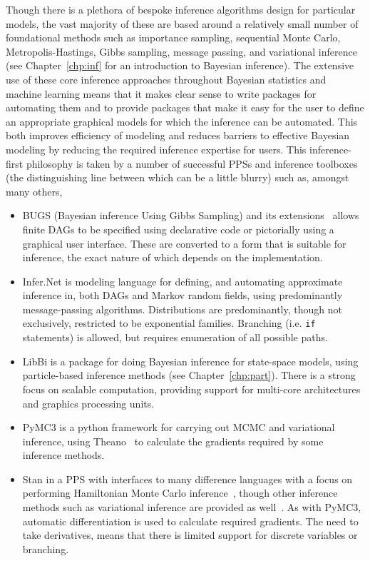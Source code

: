 Though there is a plethora of bespoke inference algorithms design for particular models, the vast majority of these are based around
a relatively small number of foundational methods such as importance sampling, sequential Monte Carlo,
Metropolis-Hastings, Gibbs sampling, message passing, and variational inference (see Chapter~\ref{chp:inf}
for an introduction to Bayesian inference).
The extensive use of these core inference approaches throughout Bayesian statistics and machine
learning means that it makes clear sense to write packages for automating them and to provide packages
that make it easy for the user to define an appropriate graphical models for which the inference can be automated.
This both improves efficiency of modeling and reduces barriers to effective Bayesian modeling by reducing the
required inference expertise for users.  This inference-first philosophy is taken by a number of successful PPSs
and inference toolboxes (the distinguishing line between which can be a little blurry) such as, amongst many others,
\begin{itemize}
	\item BUGS (Bayesian inference Using Gibbs Sampling) \citep{spiegelhalter1996bugs} and its 
	extensions~\citep{lunn2000winbugs,plummer2003jags,todeschini2014biips}
	allows finite DAGs to be specified using declarative code or pictorially using a graphical user
	interface.  These are converted to a form that is suitable for inference, the exact nature of which
	depends on the implementation.
	\item Infer.Net \citep{minka_software_2010} is modeling language for defining, and automating approximate inference in,
	both DAGs and Markov random fields, using predominantly message-passing algorithms. Distributions
	are predominantly, though not exclusively, restricted to be exponential families.  Branching (i.e. \texttt{if} statements) 
	is allowed, but requires enumeration of all possible paths.
	\item LibBi \citep{murray2013bayesian} is a package for doing Bayesian inference for state-space models,
	using particle-based inference methods (see Chapter~\ref{chp:part}).  There is a strong focus on scalable
	computation, providing support for multi-core architectures and graphics processing units.
	\item PyMC3 \citep{salvatier2016probabilistic} is a python framework for carrying out MCMC and variational
	inference, using Theano~\citep{bergstra2010theano} to calculate the gradients required by some inference methods.
	\item Stan \citep{carpenter2015stan} in a PPS with interfaces to many difference languages with a
	focus on performing Hamiltonian Monte Carlo inference~\citep{duane1987hybrid,hoffman2014no}, though
	other inference methods such as variational inference are provided as well~\citep{kucukelbir2015automatic}.
	As with PyMC3, automatic differentiation is used to calculate required gradients.  The need to take
	derivatives, means that there is limited support for discrete variables or branching.
\end{itemize}
